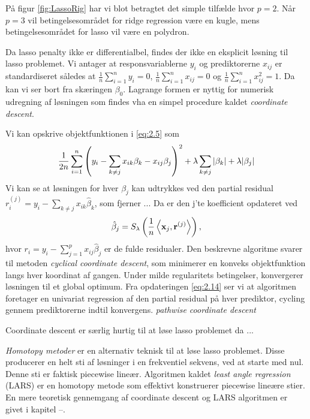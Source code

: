 På figur \ref{fig:LassoRig} har vi blot betragtet det simple tilfælde hvor $p=2$. Når $p=3$ vil betingelsesområdet for ridge regression være en kugle, mens betingelsesområdet for lasso vil være en polydron. 

Da lasso penalty ikke er differentialbel, findes der ikke en eksplicit løsning til lasso problemet.
Vi antager at responsvariablerne $y_i$ og prediktorerne $x_{ij}$ er standardiseret således at \(\frac{1}{n} \sum_{i=1}^n y_{i} = 0\), \(\frac{1}{n} \sum_{i=1}^n x_{ij} = 0\) og \(\frac{1}{n} \sum_{i=1}^n x_{ij}^2=1\).
Da kan vi ser bort fra skæringen $\beta_0$.
Lagrange formen er nyttig for numerisk udregning af løsningen som findes vha en simpel procedure kaldet \textit{coordinate descent}.

Vi kan opskrive objektfunktionen i \eqref{eq:2.5} som
\begin{align*}
\frac{1}{2n} \sum_{i=1}^n \del{y_i - \sum_{k \neq j} x_{ik} \beta_k - x_{ij} \beta_j}^2 + \lambda \sum_{k \neq j} \vert \beta_k \vert + \lambda \vert \beta_j \vert
\end{align*}
Vi kan se at løsningen for hver $\beta_j$ kan udtrykkes ved den partial residual $r_i^{(j)}=y_i - \sum_{k \neq j} x_{ik} \hat{\beta}_k$, som fjerner ...
Da er den j'te koefficient opdateret ved
\begin{align}
\hat{\beta}_j = S_\lambda \del{\frac{1}{n} \left\langle \mathbf{x}_j, \mathbf{r}^{(j)} \right\rangle}, \label{eq:2.14}
\end{align}
hvor \(r_i = y_i - \sum_{j = 1}^p x_{ij} \hat{\beta}_j \) er de fulde residualer.
Den beskrevne algoritme svarer til metoden \textit{cyclical coordinate descent}, som minimerer en konveks objektfunktion langs hver koordinat af gangen.
Under milde regularitets betingelser, konvergerer løsningen til et global optimum.
Fra opdateringen \eqref{eq:2.14} ser vi at algoritmen foretager en univariat regression af den partial residual på hver prediktor, cycling gennem prediktorerne indtil konvergens.
\textit{pathwise coordinate descent}

Coordinate descent er særlig hurtig til at løse lasso problemet da ...

\textit{Homotopy metoder} er en alternativ teknisk til at løse lasso problemet. Disse producerer en helt sti af løsninger i en frekventiel sekvens, ved at starte med nul.
Denne sti er faktisk piecewise lineær.
Algoritmen kaldet \textit{least angle regression} (LARS) er en homotopy metode som effektivt konstruerer piecewise lineære stier.
En mere teoretisk gennemgang af coordinate descent og LARS algoritmen er givet i kapitel --. 
